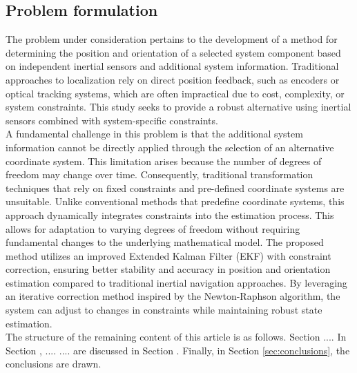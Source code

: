 \subsection{Problem formulation}

The problem under consideration pertains to the development of a method for determining the position and orientation of a selected system component based on independent inertial sensors and additional system information. Traditional approaches to localization rely on direct position feedback, such as encoders or optical tracking systems, which are often impractical due to cost, complexity, or system constraints. This study seeks to provide a robust alternative using inertial sensors combined with system-specific constraints. \\

A fundamental challenge in this problem is that the additional system information cannot be directly applied through the selection of an alternative coordinate system. This limitation arises because the number of degrees of freedom may change over time. Consequently, traditional transformation techniques that rely on fixed constraints and pre-defined coordinate systems are unsuitable. Unlike conventional methods that predefine coordinate systems, this approach dynamically integrates constraints into the estimation process. This allows for adaptation to varying degrees of freedom without requiring fundamental changes to the underlying mathematical model. The proposed method utilizes an improved Extended Kalman Filter (EKF) with constraint correction, ensuring better stability and accuracy in position and orientation estimation compared to traditional inertial navigation approaches. By leveraging an iterative correction method inspired by the Newton-Raphson algorithm, the system can adjust to changes in constraints while maintaining robust state estimation.\\

The structure of the remaining content of this article is as follows. Section .... In Section , .... .... are discussed in Section . Finally, in Section \ref{sec:conclusions}, the conclusions are drawn.
